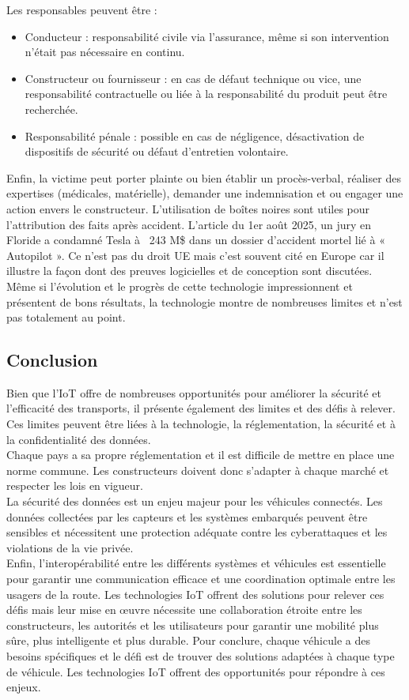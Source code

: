 Les responsables peuvent être :
\begin{itemize}
    \item Conducteur : responsabilité civile via l’assurance, même si son intervention n’était pas nécessaire en continu.
    \item Constructeur ou fournisseur : en cas de défaut technique ou vice, une responsabilité contractuelle ou liée à la responsabilité du produit peut être recherchée.
    \item Responsabilité pénale : possible en cas de négligence, désactivation de dispositifs de sécurité ou défaut d’entretien volontaire.
\end{itemize}
Enfin, la victime peut porter plainte ou bien établir un procès-verbal, réaliser des expertises (médicales, matérielle), demander une indemnisation et ou engager une action envers le constructeur. L'utilisation de boîtes noires sont utiles pour l’attribution des faits après accident. L'article\cite{tesla_condamnation} du 1er août 2025, un jury en Floride a condamné Tesla à ~243 M\$ dans un dossier d’accident mortel lié à « Autopilot ». Ce n’est pas du droit UE mais c’est souvent cité en Europe car il illustre la façon dont des preuves logicielles et de conception sont discutées.\\
Même si l'évolution et le progrès de cette technologie impressionnent et présentent de bons résultats, la technologie montre de nombreuses limites et n'est pas totalement au point.

\newpage
\subsection{Conclusion}
Bien que l’IoT offre de nombreuses opportunités pour améliorer la sécurité et l’efficacité des transports, il présente également des limites et des défis à relever. Ces limites peuvent être liées à la technologie, la réglementation, la sécurité et à la confidentialité des données.\\
Chaque pays a sa propre réglementation et il est difficile de mettre en place une norme commune. Les constructeurs doivent donc s'adapter à chaque marché et respecter les lois en vigueur.\\
La sécurité des données est un enjeu majeur pour les véhicules connectés. Les données collectées par les capteurs et les systèmes embarqués peuvent être sensibles et nécessitent une protection adéquate contre les cyberattaques et les violations de la vie privée.\\
Enfin, l'interopérabilité entre les différents systèmes et véhicules est essentielle pour garantir une communication efficace et une coordination optimale entre les usagers de la route. Les technologies IoT offrent des solutions pour relever ces défis mais leur mise en œuvre nécessite une collaboration étroite entre les constructeurs, les autorités et les utilisateurs pour garantir une mobilité plus sûre, plus intelligente et plus durable.
Pour conclure, chaque véhicule a des besoins spécifiques et le défi est de trouver des solutions adaptées à chaque type de véhicule. Les technologies IoT offrent des opportunités pour répondre à ces enjeux.
\vspace{0.5cm}

